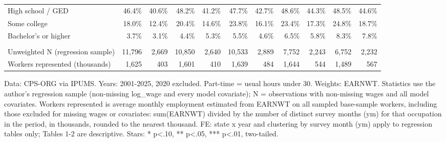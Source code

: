 \begin{table}[!t]
\begin{tabular*}{\linewidth}{@{\extracolsep{\fill}}l|rrrrrrrrrr}
High school / GED & 46.4\% & 40.6\% & 48.2\% & 41.2\% & 47.7\% & 42.7\% & 48.6\% & 44.3\% & 48.5\% & 44.6\% \\
Some college & 18.0\% & 12.4\% & 20.4\% & 14.6\% & 23.8\% & 16.1\% & 23.4\% & 17.3\% & 24.8\% & 18.7\% \\
Bachelor's or higher & 3.7\% & 3.1\% & 4.4\% & 5.3\% & 5.5\% & 4.6\% & 6.5\% & 5.8\% & 8.3\% & 7.8\% \\
\midrule\addlinespace[2.5pt]
\multicolumn{11}{l}{Sample} \\[2.5pt] 
\midrule\addlinespace[2.5pt]
Unweighted N (regression sample) & 11,796 & 2,669 & 10,850 & 2,640 & 10,533 & 2,889 & 7,752 & 2,243 & 6,752 & 2,232 \\
Workers represented (thousands) & 1,625 & 403 & 1,601 & 410 & 1,639 & 484 & 1,644 & 544 & 1,489 & 567 \\
\bottomrule
\end{tabular*}
\begin{minipage}{\linewidth}
Data: CPS-ORG via IPUMS. Years: 2001-2025, 2020 excluded. Part-time = usual hours under 30. Weights: EARNWT. Statistics use the author's regression sample (non-missing log\_wage and every model covariate); N = observations with non-missing wages and all model covariates. Workers represented is average monthly employment estimated from EARNWT on all sampled base-sample workers, including those excluded for missing wages or covariates: sum(EARNWT) divided by the number of distinct survey months (ym) for that occupation in the period, in thousands, rounded to the nearest thousand. FE: state x year and clustering by survey month (ym) apply to regression tables only; Tables 1-2 are descriptive. Stars: * p<.10, ** p<.05, *** p<.01, two-tailed.\\
\end{minipage}
\end{table}
